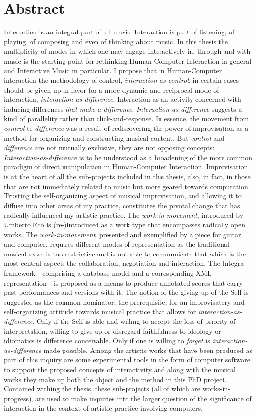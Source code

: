 \section*{Abstract}
\label{cha:abstract}
\setcounter{page}{1}
\pagestyle{plain}

Interaction is an integral part of all music. Interaction is part of listening, of playing, of composing and even of thinking about music. In this thesis the multiplicity of modes in which one may engage interactively in, through and with music is the starting point for rethinking Human-Computer Interaction in general and Interactive Music in particular. I propose that in Human-Computer interaction the methodology of control, \emph{interaction-as-control}, in certain cases should be given up in favor for a more dynamic and reciprocal mode of interaction, \emph{interaction-as-difference}: Interaction as an activity concerned with inducing differences \emph{that make a difference}. \emph{Interaction-as-difference} suggests a kind of parallelity rather than click-and-response. In essence, the movement from \emph{control} to \emph{difference} was a result of rediscovering the power of improvisation as a method for organizing and constructing musical content. But \emph{control} and \emph{difference} are not mutually exclusive, they are not opposing concepts: \emph{Interaction-as-difference} is to be understood as a broadening of the more common paradigm of direct manipulation in Human-Computer Interaction. Improvisation is at the heart of all the sub-projects included in this thesis, also, in fact, in those that are not immediately related to music but more geared towards computation. Trusting the self-organizing aspect of musical improvisation, and allowing it to diffuse into other areas of my practice, constitutes the pivotal change that has radically influenced my artistic practice. The {\emph{work-in-movement}}, introduced by Umberto Eco is (re-)introduced as a work type that encompasses radically open works. The \emph{work-in-movement}, presented and exemplified by a piece for guitar and computer, requires different modes of representation as the traditional musical score is too restrictive and is not able to communicate that which is the most central aspect: the collaboration, negotiation and interaction. The Integra framework---comprising a database model and a corresponding XML representation---is proposed as a means to produce annotated scores that carry past performances and versions with it. The notion of the giving up of the Self is suggested as the common nominator, the prerequisite, for an improvisatory and self-organizing attitude towards musical practice that allows for \emph{interaction-as-difference}. Only if the Self is able and willing to accept the loss of priority of interpretation, willing to give up or disregard faithfulness to ideology or idiomatics is difference conceivable. Only if one is willing to \emph{forget} is \emph{interaction-as-difference} made possible. Among the artistic works that have been produced as part of this inquiry are some experimental tools in the form of computer software to support the proposed concepts of interactivity and along with the musical works they make up both the object and the method in this PhD project. Contained withing the thesis, these sub-projects (all of which are works-in-progress), are used to make inquiries into the larger question of the significance of interaction in the context of artistic practice involving computers.

